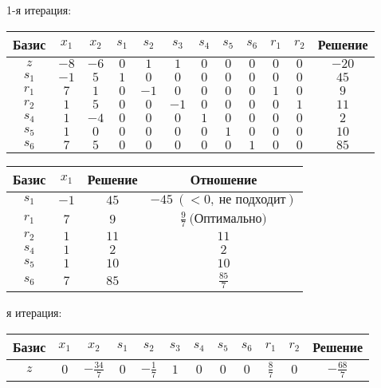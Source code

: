 \documentclass{article}%
\begin{document}
\begin{flushleft}%
1{-}я итерация: %
\newline%
\newline%
\renewcommand{\arraystretch}{1.3}%
\begin{tabular}{|c|cccccccccc|c|}%
\hline%
Базис&$x_{1}$&$x_{2}$&$s_{1}$&$s_{2}$&$s_{3}$&$s_{4}$&$s_{5}$&$s_{6}$&$r_{1}$&$r_{2}$&Решение\\%
\hline%
$z$&$-8$&$-6$&$0$&$1$&$1$&$0$&$0$&$0$&$0$&$0$&$-20$\\%
\hline%
$s_{1}$&$-1$&$5$&$1$&$0$&$0$&$0$&$0$&$0$&$0$&$0$&$45$\\%
$r_{1}$&$7$&$1$&$0$&$-1$&$0$&$0$&$0$&$0$&$1$&$0$&$9$\\%
$r_{2}$&$1$&$5$&$0$&$0$&$-1$&$0$&$0$&$0$&$0$&$1$&$11$\\%
$s_{4}$&$1$&$-4$&$0$&$0$&$0$&$1$&$0$&$0$&$0$&$0$&$2$\\%
$s_{5}$&$1$&$0$&$0$&$0$&$0$&$0$&$1$&$0$&$0$&$0$&$10$\\%
$s_{6}$&$7$&$5$&$0$&$0$&$0$&$0$&$0$&$1$&$0$&$0$&$85$\\%
\hline%
\end{tabular}%
\newline%
\newline%
\newline%
\begin{tabular}{|cccc|}%
\hline%
Базис&$x_{1}$&Решение&Отношение\\%
\hline%
$s_{1}$&$-1$&$45$&$-45\: (< 0, \: \text{не подходит})$\\%
$r_{1}$&$7$&$9$&$\frac{9}{7}\: \text{(Оптимально)}$\\%
$r_{2}$&$1$&$11$&$11$\\%
$s_{4}$&$1$&$2$&$2$\\%
$s_{5}$&$1$&$10$&$10$\\%
$s_{6}$&$7$&$85$&$\frac{85}{7}$\\%
\hline%
\end{tabular}%
\newline%
\newline%
я итерация: %
\newline%
\newline%
\renewcommand{\arraystretch}{1.3}%
\begin{tabular}{|c|cccccccccc|c|}%
\hline%
Базис&$x_{1}$&$x_{2}$&$s_{1}$&$s_{2}$&$s_{3}$&$s_{4}$&$s_{5}$&$s_{6}$&$r_{1}$&$r_{2}$&Решение\\%
\hline%
$z$&$0$&$-\frac{34}{7}$&$0$&$-\frac{1}{7}$&$1$&$0$&$0$&$0$&$\frac{8}{7}$&$0$&$-\frac{68}{7}$\\%

\end{tabular}
\end{flushleft}
\end{document}

